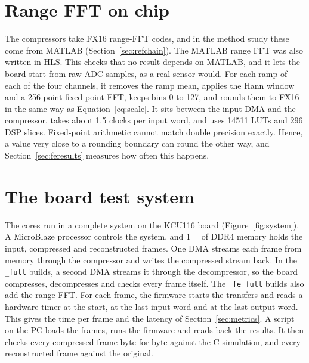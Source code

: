 \section{Range FFT on chip}
\label{sec:fehw}

The compressors take FX16 range-FFT codes, and in the method study these come
from MATLAB (Section~\ref{sec:refchain}). The MATLAB range FFT was also written
in HLS. This checks that no result depends on MATLAB, and it lets the board
start from raw ADC samples, as a real sensor would. For each ramp of each of
the four channels, it removes the ramp mean, applies the Hann window and a
256-point fixed-point FFT, keeps bins 0 to 127, and rounds them to FX16 in the
same way as Equation~\eqref{eq:scale}. It sits between the input DMA and the
compressor, takes about 1.5 clocks per input word, and uses \num{14511} LUTs
and 296 DSP slices. Fixed-point arithmetic cannot match double precision
exactly. Hence, a value very close to a rounding boundary can round the other
way, and Section~\ref{sec:feresults} measures how often this happens.

\section{The board test system}
\label{sec:system}

The cores run in a complete system on the KCU116 board
(Figure~\ref{fig:system}). A MicroBlaze processor controls the system, and
\SI{1}{\giga\byte} of DDR4 memory holds the input, compressed and
reconstructed frames. One DMA streams each frame from memory through the
compressor and writes the compressed stream back. In the \texttt{\_full}
builds, a second DMA streams it through the decompressor, so the board
compresses, decompresses and checks every frame itself. The
\texttt{\_fe\_full} builds also add the range FFT. For each frame, the
firmware starts the transfers and reads a hardware timer at the start, at the
last input word and at the last output word. This gives the time per frame and
the latency of Section~\ref{sec:metrics}. A script on the PC loads the frames,
runs the firmware and reads back the results. It then checks every compressed
frame byte for byte against the C-simulation, and every reconstructed frame
against the original.

